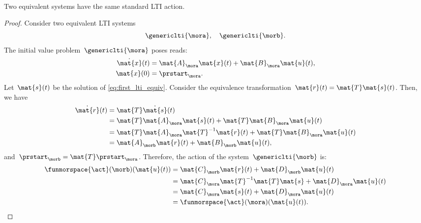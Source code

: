 \begin{lemma}
    \label{lem:equivsystequivact}
    Two equivalent systems have the same standard LTI action.
\end{lemma}

\begin{proof}
    Consider two equivalent LTI systems
    \begin{equation}
        \genericlti{\mora},\quad \genericlti{\morb}.
    \end{equation}
    The initial value problem~$\genericlti{\mora}$ poses reads:
    \begin{equation}
        \label{eq:first_lti_equiv}
        \begin{aligned}
            \dot{\mat{x}}(t) & =\mat{A}_{\mora}\mat{x}(t)+\mat{B}_{\mora}\mat{u}(t), \\
            \mat{x}(0)       & = \prstart_\mora.
        \end{aligned}
    \end{equation}
    Let~$\mat{s}(t)$ be the solution of \cref{eq:first_lti_equiv}.
    Consider the equivalence transformation~$\mat{r}(t)\linebreak[0]=\mat{T}\mat{s}(t)$.
    Then, we have
    \begin{equation}
        \begin{aligned}
            \dot{\mat{r}}(t) & =\mat{T}\dot{\mat{s}}(t) \\
                             & =\mat{T}\mat{A}_\mora \mat{s}(t)+\mat{T}\mat{B}_\mora \mat{u}(t) \\
                             & =\mat{T}\mat{A}_\mora \mat{T}^{-1}\mat{r}(t)+\mat{T}\mat{B}_\mora \mat{u}(t) \\
                             & =\mat{A}_\morb\mat{r}(t)+\mat{B}_\morb \mat{u}(t),
        \end{aligned}
    \end{equation}
    and~$ \prstart_\morb=\mat{T} \prstart_\mora$.
    Therefore, the action of the system~$\genericlti{\morb}$ is:
    \begin{equation}
        \begin{aligned}
            \funmorspace{\act}(\morb)(\mat{u}(t)) & =\mat{C}_\morb \mat{r}(t)+ \mat{D}_\morb \mat{u}(t) \\
                                                  & =\mat{C}_\mora \mat{T}^{-1}\mat{T}\mat{s}+\mat{D}_\mora \mat{u}(t) \\
                                                  & =\mat{C}_\mora \mat{s}(t)+\mat{D}_\mora \mat{u}(t) \\
                                                  & =\funmorspace{\act}(\mora)(\mat{u}(t)).
        \end{aligned}
    \end{equation}
\end{proof}

